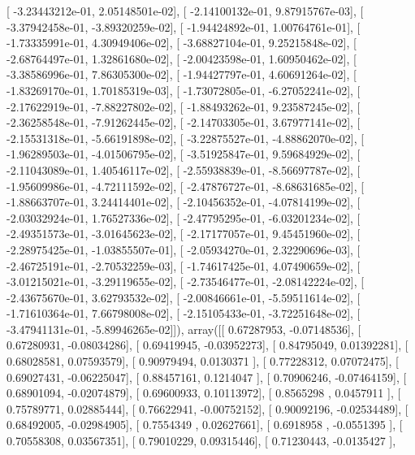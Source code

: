 \documentclass{article}
\begin{document}
       [ -3.23443212e-01,   2.05148501e-02],
       [ -2.14100132e-01,   9.87915767e-03],
       [ -3.37942458e-01,  -3.89320259e-02],
       [ -1.94424892e-01,   1.00764761e-01],
       [ -1.73335991e-01,   4.30949406e-02],
       [ -3.68827104e-01,   9.25215848e-02],
       [ -2.68764497e-01,   1.32861680e-02],
       [ -2.00423598e-01,   1.60950462e-02],
       [ -3.38586996e-01,   7.86305300e-02],
       [ -1.94427797e-01,   4.60691264e-02],
       [ -1.83269170e-01,   1.70185319e-03],
       [ -1.73072805e-01,  -6.27052241e-02],
       [ -2.17622919e-01,  -7.88227802e-02],
       [ -1.88493262e-01,   9.23587245e-02],
       [ -2.36258548e-01,  -7.91262445e-02],
       [ -2.14703305e-01,   3.67977141e-02],
       [ -2.15531318e-01,  -5.66191898e-02],
       [ -3.22875527e-01,  -4.88862070e-02],
       [ -1.96289503e-01,  -4.01506795e-02],
       [ -3.51925847e-01,   9.59684929e-02],
       [ -2.11043089e-01,   1.40546117e-02],
       [ -2.55938839e-01,  -8.56697787e-02],
       [ -1.95609986e-01,  -4.72111592e-02],
       [ -2.47876727e-01,  -8.68631685e-02],
       [ -1.88663707e-01,   3.24414401e-02],
       [ -2.10456352e-01,  -4.07814199e-02],
       [ -2.03032924e-01,   1.76527336e-02],
       [ -2.47795295e-01,  -6.03201234e-02],
       [ -2.49351573e-01,  -3.01645623e-02],
       [ -2.17177057e-01,   9.45451960e-02],
       [ -2.28975425e-01,  -1.03855507e-01],
       [ -2.05934270e-01,   2.32290696e-03],
       [ -2.46725191e-01,  -2.70532259e-03],
       [ -1.74617425e-01,   4.07490659e-02],
       [ -3.01215021e-01,  -3.29119655e-02],
       [ -2.73546477e-01,  -2.08142224e-02],
       [ -2.43675670e-01,   3.62793532e-02],
       [ -2.00846661e-01,  -5.59511614e-02],
       [ -1.71610364e-01,   7.66798008e-02],
       [ -2.15105433e-01,  -3.72251648e-02],
       [ -3.47941131e-01,  -5.89946265e-02]]), array([[ 0.67287953, -0.07148536],
       [ 0.67280931, -0.08034286],
       [ 0.69419945, -0.03952273],
       [ 0.84795049,  0.01392281],
       [ 0.68028581,  0.07593579],
       [ 0.90979494,  0.0130371 ],
       [ 0.77228312,  0.07072475],
       [ 0.69027431, -0.06225047],
       [ 0.88457161,  0.1214047 ],
       [ 0.70906246, -0.07464159],
       [ 0.68901094, -0.02074879],
       [ 0.69600933,  0.10113972],
       [ 0.8565298 ,  0.0457911 ],
       [ 0.75789771,  0.02885444],
       [ 0.76622941, -0.00752152],
       [ 0.90092196, -0.02534489],
       [ 0.68492005, -0.02984905],
       [ 0.7554349 ,  0.02627661],
       [ 0.6918958 , -0.0551395 ],
       [ 0.70558308,  0.03567351],
       [ 0.79010229,  0.09315446],
       [ 0.71230443, -0.0135427 ],
\end{document}
